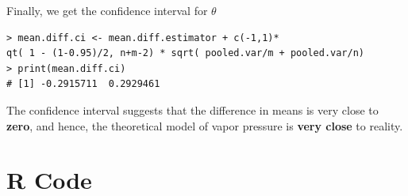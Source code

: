 \documentclass[12pt,letterpaper,titlepage,en-US]{article}
\begin{document}
Finally, we get the confidence interval for $\theta$
\begin{knitrout}
\color{fgcolor}
\begin{kframe}
\begin{verbatim}
> mean.diff.ci <- mean.diff.estimator + c(-1,1)*
qt( 1 - (1-0.95)/2, n+m-2) * sqrt( pooled.var/m + pooled.var/n)
> print(mean.diff.ci)
# [1] -0.2915711  0.2929461
\end{verbatim}
\end{kframe}
\end{knitrout}

The confidence interval suggests that the difference in means is very close to \textbf{zero}, and hence, the theoretical model of vapor pressure is \textbf{very close} to reality.



\section{R Code}
%
%
%
%
\end{document}
